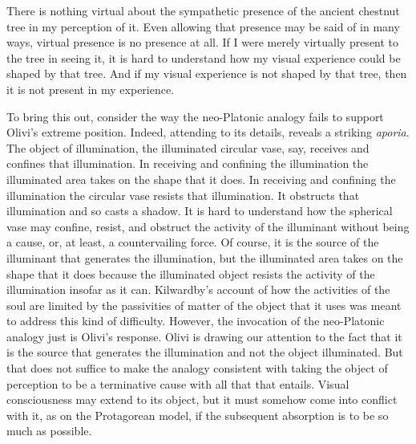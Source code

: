 There is nothing virtual about the sympathetic presence of the ancient chestnut tree in my perception of it. Even allowing that presence may be said of in many ways, virtual presence is no presence at all. If I were merely virtually present to the tree in seeing it, it is hard to understand how my visual experience could be shaped by that tree. And if my visual experience is not shaped by that tree, then it is not present in my experience.

To bring this out, consider the way the neo-Platonic analogy fails to support Olivi's extreme position. Indeed, attending to its details, reveals a striking \emph{aporia}. The object of illumination, the illuminated circular vase, say, receives and confines that illumination. In receiving and confining the illumination the illuminated area takes on the shape that it does. In receiving and confining the illumination the circular vase resists that illumination. It obstructs that illumination and so casts a shadow. It is hard to understand how the spherical vase may confine, resist, and obstruct the activity of the illuminant without being a cause, or, at least, a countervailing force. Of course, it is the source of the illuminant that generates the illumination, but the illuminated area takes on the shape that it does because the illuminated object resists the activity of the illumination insofar as it can. Kilwardby's account of how the activities of the soul are limited by the passivities of matter of the object that it uses was meant to address this kind of difficulty. However, the invocation of the neo-Platonic analogy just is Olivi's response. Olivi is drawing our attention to the fact that it is the source that generates the illumination and not the object illuminated. But that does not suffice to make the analogy consistent with taking the object of perception to be a terminative cause with all that that entails. Visual consciousness may extend to its object, but it must somehow come into conflict with it, as on the Protagorean model, if the subsequent absorption is to be so much as possible. 

